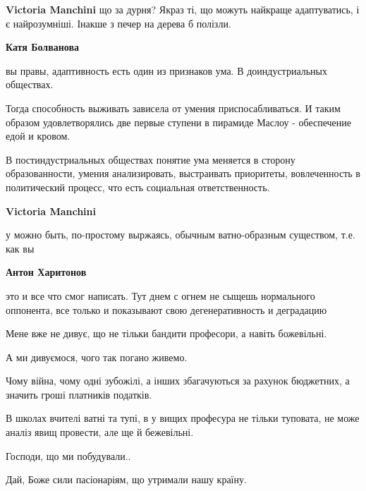 \begin{itemize}
\begin{itemize}
\textbf{Victoria Manchini} що за дурня? Якраз ті, що можуть найкраще адаптуватись, і є найрозумніші. Інакше з печер на дерева б полізли.


\textbf{Катя Болванова} 

вы правы, адаптивность есть один из признаков ума. В доиндустриальных обществах.

Тогда способность выживать зависела от умения приспосабливаться. И таким
образом удовлетворялись две первые ступени в пирамиде Маслоу - обеспечение едой
и кровом.

В постиндустриальных обществах понятие ума меняется в сторону образованности,
умения анализировать, выстраивать приоритеты, вовлеченность в политический
процесс, что есть социальная ответственность.



\textbf{Victoria Manchini} 

у можно быть, по-простому выржаясь, обычным ватно-образным существом, т.е. как вы


\textbf{Антон Харитонов} 

это и все что смог написать. Тут днем с огнем не
сыщешь нормального оппонента, все только и показывают свою дегенеративность и
деградацию
\end{itemize}



Мене вже не дивує, що не тільки бандити професори, а навіть божевільні.

А ми дивуємося, чого так погано живемо.

Чому війна, чому одні зубожілі, а інших збагачуються за рахунок бюджетних, а
значить гроші платників податків.

В школах вчителі ватні та тупі, в у вищих професура не тільки туповата, не може
аналіз явищ провести, але ще й бежевільні.

Господи, що ми побудували..

Дай, Боже сили пасіонаріям, що утримали нашу країну.


\end{itemize}
